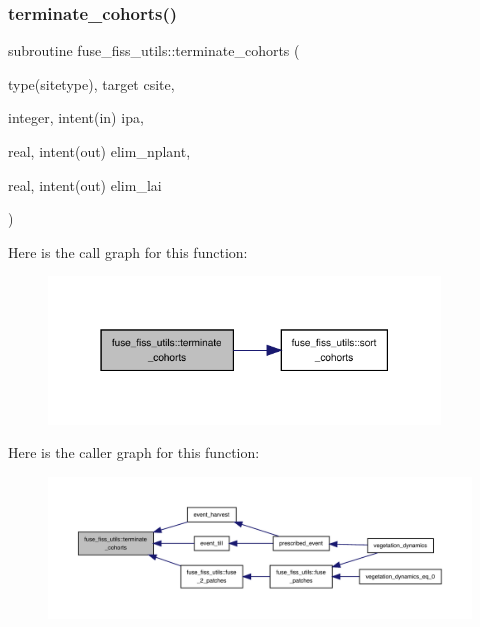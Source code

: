 \subsubsection{\texorpdfstring{terminate\+\_\+cohorts()}{terminate\_cohorts()}}
{\footnotesize\ttfamily subroutine fuse\+\_\+fiss\+\_\+utils\+::terminate\+\_\+cohorts (\begin{DoxyParamCaption}\item[{type(sitetype), target}]{csite,  }\item[{integer, intent(in)}]{ipa,  }\item[{real, intent(out)}]{elim\+\_\+nplant,  }\item[{real, intent(out)}]{elim\+\_\+lai }\end{DoxyParamCaption})}

Here is the call graph for this function\+:
\nopagebreak
\begin{figure}[H]
\begin{center}
\leavevmode
\includegraphics[width=295pt]{namespacefuse__fiss__utils_a5dc8f0ad95ff159ac69570ac55856524_cgraph}
\end{center}
\end{figure}
Here is the caller graph for this function\+:
\nopagebreak
\begin{figure}[H]
\begin{center}
\leavevmode
\includegraphics[width=350pt]{namespacefuse__fiss__utils_a5dc8f0ad95ff159ac69570ac55856524_icgraph}
\end{center}
\end{figure}
\mbox{\label{namespacefuse__fiss__utils_a480df748f946b24daa940c15d72abfe2}} 

